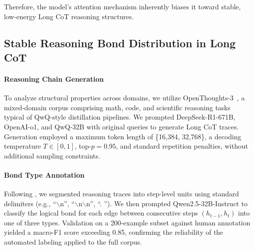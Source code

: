 Therefore, the model's attention mechanism inherently biases it toward stable, low-energy Long CoT reasoning structures.


\subsection{Stable Reasoning Bond Distribution in Long CoT}
\label{append:stable-bond}
\paragraph{\textbf{Reasoning Chain Generation}}
To analyze structural properties across domains, we utilize OpenThoughts-3~\citep{guha2025openthoughts}, a mixed-domain corpus comprising math, code, and scientific reasoning tasks typical of QwQ-style distillation pipelines. We prompted DeepSeek-R1-671B, OpenAI-o1, and QwQ-32B with original queries to generate Long CoT traces. Generation employed a maximum token length of \{16,384, 32,768\}, a decoding temperature $T \in [0,1]$, top-\(p = 0.95\), and standard repetition penalties, without additional sampling constraints.\vspace{-5pt}



\paragraph{\textbf{Bond Type Annotation}}
\label{append:annotation}
Following \citet{golovneva2023roscoe,chen2024unlocking}, we segmented reasoning traces into step-level units using standard delimiters (e.g., ``$\backslash$n'', ``$\backslash$n$\backslash$n'', ``. '').
We then prompted Qwen2.5-32B-Instruct to classify the logical bond for each edge between consecutive steps \((h_{t-1}, h_{t})\) into one of three types. Validation on a 200-example subset against human annotation yielded a macro-F1 score exceeding 0.85, confirming the reliability of the automated labeling applied to the full corpus.

